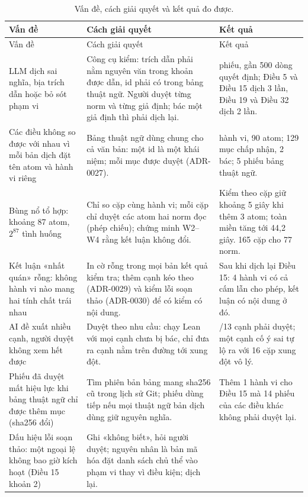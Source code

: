 \documentclass[12pt,a4paper]{article}
\begin{document}
\begin{longtable}{>{\raggedright\arraybackslash}p{4.1cm}>{\raggedright\arraybackslash}p{6.0cm}>{\raggedright\arraybackslash}p{4.3cm}}
\caption{Vấn đề, cách giải quyết và kết quả đo được.}\label{tab:problems}\\
\toprule
Vấn đề & Cách giải quyết & Kết quả\\
\midrule
\endfirsthead
\toprule
Vấn đề & Cách giải quyết & Kết quả\\
\midrule
\endhead
\bottomrule
\endfoot
LLM dịch sai nghĩa, bịa trích dẫn hoặc bỏ sót phạm vi &
Công cụ kiểm: trích dẫn phải nằm nguyên văn trong khoản được dẫn, id phải có trong bảng thuật ngữ. Người duyệt từng norm và
từng giả định; bác một giả định thì phải dịch lại. &
28 phiếu, gần 500 dòng quyết định; Điều 5 và Điều 15 dịch 3 lần, Điều 19 và Điều 32 dịch 2 lần.\\
Các điều không so được với nhau vì mỗi bản dịch đặt tên atom và hành vi riêng &
Bảng thuật ngữ dùng chung cho cả văn bản: một id là một khái niệm; mỗi mục được duyệt (ADR-0027). &
41 hành vi, 90 atom; 129 mục chấp nhận, 2 bác; 5 phiếu bảng thuật ngữ.\\
Bùng nổ tổ hợp: khoảng 87 atom, $2^{87}$ tình huống &
Chỉ so cặp cùng hành vi; mỗi cặp chỉ duyệt các atom hai norm đọc (phép chiếu); chứng minh W2--W4 rằng kết luận không đổi. &
Kiểm theo cặp giữ khoảng 5 giây khi thêm 3 atom; toàn miền tăng tới 44,2 giây. 165 cặp cho 77 norm.\\
Kết luận «nhất quán» rỗng: không hành vi nào mang hai tính chất trái nhau &
In cờ rỗng trong mọi bản kết quả kiểm tra; thêm cạnh kéo theo (ADR-0029) và kiểm lỗi soạn thảo (ADR-0030) để có kiểm có nội dung. &
Sau khi dịch lại Điều 15: 4 hành vi có cả cấm lẫn cho phép, kết luận có nội dung ở đó.\\
AI đề xuất nhiều cạnh, người duyệt không xem hết được &
Duyệt theo nhu cầu: chạy Lean với mọi cạnh chưa bị bác, chỉ đưa ra cạnh nằm trên đường tới xung đột. &
2/13 cạnh phải duyệt; một cạnh cố ý sai tự lộ ra với 16 cặp xung đột vô lý.\\
Phiếu đã duyệt mất hiệu lực khi bảng thuật ngữ chỉ được thêm mục (sha256 đổi) &
Tìm phiên bản bảng mang sha256 cũ trong lịch sử Git; phiếu dùng tiếp nếu mọi thuật ngữ bản dịch dùng giữ nguyên nghĩa. &
Thêm 1 hành vi cho Điều 15 mà 14 phiếu của các điều khác không phải duyệt lại.\\
Dấu hiệu lỗi soạn thảo: một ngoại lệ không bao giờ kích hoạt (Điều 15 khoản 2) &
Ghi «không biết», hỏi người duyệt; nguyên nhân là bản mã hóa đặt danh sách chủ thể vào phạm vi thay vì điều kiện; dịch lại. &

\end{longtable}
\end{document}
